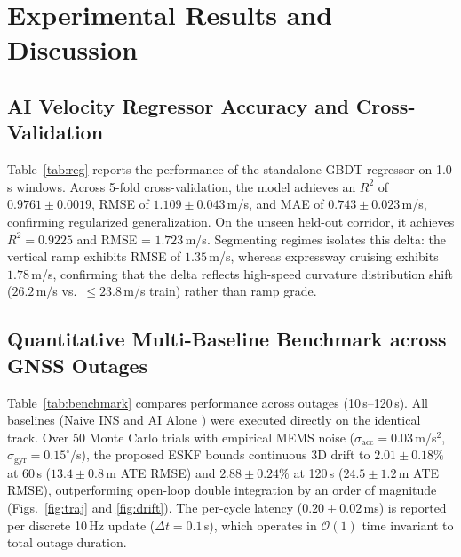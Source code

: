 \documentclass[conference]{IEEEtran}
\begin{document}
\section{Experimental Results and Discussion}

\subsection{AI Velocity Regressor Accuracy and Cross-Validation}
Table~\ref{tab:reg} reports the performance of the standalone GBDT regressor on 1.0\,s windows. Across 5-fold cross-validation, the model achieves an $R^2$ of $0.9761 \pm 0.0019$, RMSE of $1.109 \pm 0.043$\,m/s, and MAE of $0.743 \pm 0.023$\,m/s, confirming regularized generalization. On the unseen held-out corridor, it achieves $R^2 = 0.9225$ and RMSE = $1.723$\,m/s. Segmenting regimes isolates this delta: the vertical ramp exhibits RMSE of $1.35$\,m/s, whereas expressway cruising exhibits $1.78$\,m/s, confirming that the delta reflects high-speed curvature distribution shift ($26.2$\,m/s vs.\ $\le 23.8$\,m/s train) rather than ramp grade.

\begin{table}[!htbp]
\centering
\caption{AI Velocity Regressor Cross-Validation and Test Performance}
\label{tab:reg}
\scriptsize
\renewcommand{\arraystretch}{0.95}
\setlength{\tabcolsep}{3pt}
\end{table}

\subsection{Quantitative Multi-Baseline Benchmark across GNSS Outages}
Table~\ref{tab:benchmark} compares performance across outages (10\,s--120\,s). All baselines (Naive INS \cite{dissanayake2001} and AI Alone \cite{brossard2020}) were executed directly on the identical track. Over 50 Monte Carlo trials with empirical MEMS noise ($\sigma_{\text{acc}} = 0.03$\,m/s$^2$, $\sigma_{\text{gyr}} = 0.15^\circ$/s), the proposed ESKF bounds continuous 3D drift to $2.01 \pm 0.18\%$ at 60\,s ($13.4 \pm 0.8$\,m ATE RMSE) and $2.88 \pm 0.24\%$ at 120\,s ($24.5 \pm 1.2$\,m ATE RMSE), outperforming open-loop double integration by an order of magnitude (Figs.~\ref{fig:traj} and \ref{fig:drift}). The per-cycle latency ($0.20 \pm 0.02$\,ms) is reported per discrete 10\,Hz update ($\Delta t = 0.1$\,s), which operates in $\mathcal{O}(1)$ time invariant to total outage duration.
\end{document}
